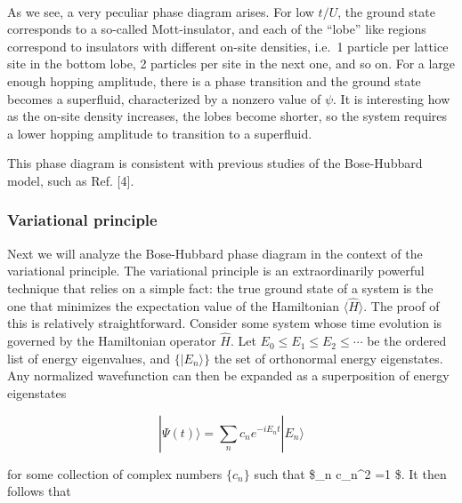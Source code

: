 \documentclass[11pt]{article}
\begin{document}
    \begin{center}
    \end{center}
    { \hspace*{\fill} \\}
    
    As we see, a very peculiar phase diagram arises. For low \(t/U\), the
ground state corresponds to a so-called Mott-insulator, and each of the
``lobe'' like regions correspond to insulators with different on-site
densities, i.e.~1 particle per lattice site in the bottom lobe, 2
particles per site in the next one, and so on. For a large enough
hopping amplitude, there is a phase transition and the ground state
becomes a superfluid, characterized by a nonzero value of \(\psi\). It
is interesting how as the on-site density increases, the lobes become
shorter, so the system requires a lower hopping amplitude to transition
to a superfluid.

This phase diagram is consistent with previous studies of the
Bose-Hubbard model, such as Ref. {[}4{]}.

    \hypertarget{variational-principle}{%
\subsubsection{Variational principle}\label{variational-principle}}

    Next we will analyze the Bose-Hubbard phase diagram in the context of
the variational principle. The variational principle is an
extraordinarily powerful technique that relies on a simple fact: the
true ground state of a system is the one that minimizes the expectation
value of the Hamiltonian \(\langle \hat H \rangle\). The proof of this
is relatively straightforward. Consider some system whose time evolution
is governed by the Hamiltonian operator \(\hat H\). Let
\(E_0 \leq E_1 \leq E_2 \leq \cdots\) be the ordered list of energy
eigenvalues, and \(\{ | E_n \rangle \}\) the set of orthonormal energy
eigenstates. Any normalized wavefunction can then be expanded as a
superposition of energy eigenstates

\begin{equation*}
| \Psi(t) \rangle = \sum_n c_n e^{-i E_n t} | E_n \rangle
\end{equation*}

for some collection of complex numbers \(\{c_n\}\) such that \$\sum\_n
\textbar{}c\_n\textbar{}\^{}2 =1 \$. It then follows that
\end{document}
